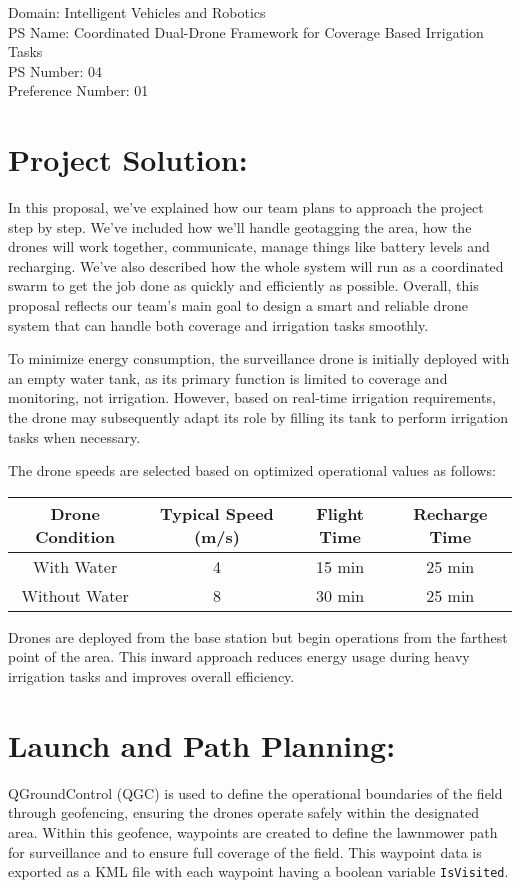 \documentclass[12pt]{article}
\begin{document}
\vspace{1em}
Domain: Intelligent Vehicles and Robotics \\
PS Name: Coordinated Dual-Drone Framework for Coverage Based Irrigation Tasks \\
PS Number: 04 \\
Preference Number: 01

\section*{Project Solution:}
In this proposal, we’ve explained how our team plans to approach the project step by step. We’ve included how we’ll handle geotagging the area, how the drones will work together, communicate, manage things like battery levels and recharging. We’ve also described how the whole system will run as a coordinated swarm to get the job done as quickly and efficiently as possible. Overall, this proposal reflects our team's main goal to design a smart and reliable drone system that can handle both coverage and irrigation tasks smoothly.

To minimize energy consumption, the surveillance drone is initially deployed with an empty water tank, as its primary function is limited to coverage and monitoring, not irrigation. However, based on real-time irrigation requirements, the drone may subsequently adapt its role by filling its tank to perform irrigation tasks when necessary.

The drone speeds are selected based on optimized operational values as follows:

\begin{center}
\begin{tabular}{|c|c|c|c|}
\hline
\textbf{Drone Condition} & \textbf{Typical Speed (m/s)} & \textbf{Flight Time} & \textbf{Recharge Time} \\
\hline
With Water & 4 & 15 min & 25 min \\
Without Water & 8 & 30 min & 25 min \\
\hline
\end{tabular}
\end{center}

Drones are deployed from the base station but begin operations from the farthest point of the area. This inward approach reduces energy usage during heavy irrigation tasks and improves overall efficiency.

\section*{Launch and Path Planning:}
QGroundControl (QGC) is used to define the operational boundaries of the field through geofencing, ensuring the drones operate safely within the designated area. Within this geofence, waypoints are created to define the lawnmower path for surveillance and to ensure full coverage of the field. This waypoint data is exported as a KML file with each waypoint having a boolean variable \texttt{IsVisited}.
\end{document}
